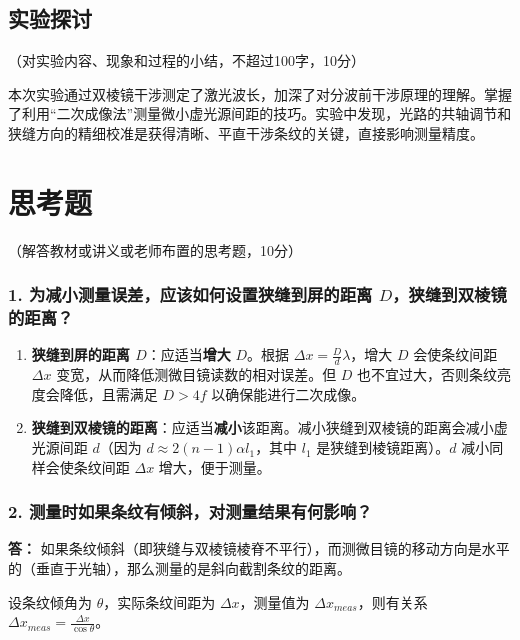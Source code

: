\documentclass[10pt,a4paper]{ctexart}
\newcommand{\myspace}[1]{\par\vspace{#1\baselineskip}} %
\newcommand{\xiaosi}{\fontsize{12pt}{16pt}\selectfont}
\begin{document}
    \subsection{实验探讨}
    \xiaosi （对实验内容、现象和过程的小结，不超过100字，10分）

    \myspace{1}

    本次实验通过双棱镜干涉测定了激光波长，加深了对分波前干涉原理的理解。掌握了利用“二次成像法”测量微小虚光源间距的技巧。实验中发现，光路的共轴调节和狭缝方向的精细校准是获得清晰、平直干涉条纹的关键，直接影响测量精度。       
    
    \section{思考题}

    \xiaosi （解答教材或讲义或老师布置的思考题，10分）

    \subsubsection*{1. 为减小测量误差，应该如何设置狭缝到屏的距离 $D$，狭缝到双棱镜的距离？}


    \begin{enumerate}
        \item \textbf{狭缝到屏的距离 $D$}：应适当\textbf{增大} $D$。根据 $\Delta x = \frac{D}{d}\lambda$，增大 $D$ 会使条纹间距 $\Delta x$ 变宽，从而降低测微目镜读数的相对误差。但 $D$ 也不宜过大，否则条纹亮度会降低，且需满足 $D > 4f$ 以确保能进行二次成像。
        \item \textbf{狭缝到双棱镜的距离}：应适当\textbf{减小}该距离。减小狭缝到双棱镜的距离会减小虚光源间距 $d$（因为 $d \approx 2(n-1)\alpha l_1$，其中 $l_1$ 是狭缝到棱镜距离）。$d$ 减小同样会使条纹间距 $\Delta x$ 增大，便于测量。
    \end{enumerate}

    \subsubsection*{2. 测量时如果条纹有倾斜，对测量结果有何影响？}

    \textbf{答：}
    如果条纹倾斜（即狭缝与双棱镜棱脊不平行），而测微目镜的移动方向是水平的（垂直于光轴），那么测量的是斜向截割条纹的距离。
    
    设条纹倾角为 $\theta$，实际条纹间距为 $\Delta x$，测量值为 $\Delta x_{meas}$，则有关系 $\Delta x_{meas} = \frac{\Delta x}{\cos \theta}$。
    
\end{document}
